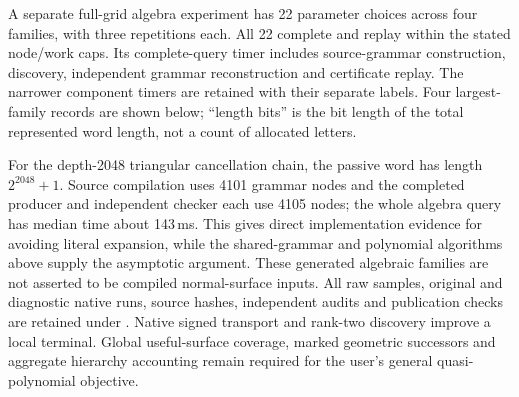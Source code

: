 A separate full-grid algebra experiment has 22 parameter choices across
four families, with three repetitions each.  All 22 complete and replay
within the stated node/work caps.  Its complete-query timer includes
source-grammar construction, discovery, independent grammar reconstruction
and certificate replay.  The narrower component timers are retained with
their separate labels.  Four largest-family records are shown below;
``length bits'' is the bit length of the total represented word length,
not a count of allocated letters.



For the depth-2048 triangular cancellation chain, the passive word has
length $2^{2048}+1$.  Source compilation uses 4101 grammar nodes and the
completed producer and independent checker each use 4105 nodes; the
whole algebra query has median time about 143\,ms.  This gives direct
implementation evidence for avoiding literal expansion, while the
shared-grammar and polynomial algorithms above supply the asymptotic
argument.  These generated algebraic families are not asserted to be
compiled normal-surface inputs.  All raw samples, original and diagnostic
native runs, source hashes, independent audits and publication checks are
retained under .  Native signed transport and
rank-two discovery improve a local terminal.  Global useful-surface
coverage, marked geometric successors and aggregate hierarchy accounting
remain required for the user's general quasi-polynomial objective.
